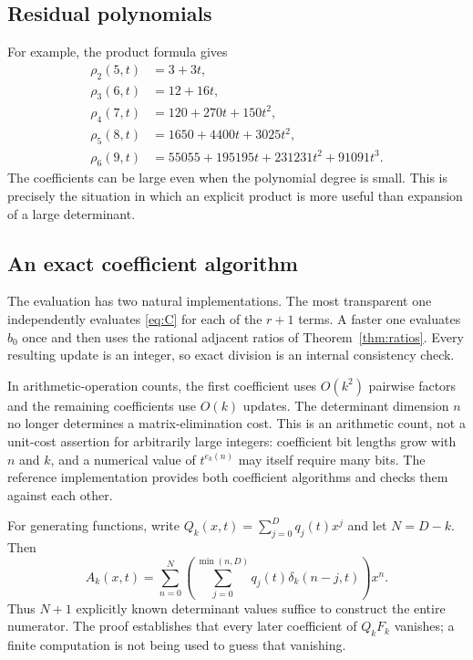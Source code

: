 \documentclass[11pt,letterpaper]{article}
\numberwithin{equation}{section}
\theoremstyle{definition}
\begin{document}
\subsection{Residual polynomials}
For example, the product formula gives
\begin{align*}
 \rho_2(5,t)&=3+3t,\\
 \rho_3(6,t)&=12+16t,\\
 \rho_4(7,t)&=120+270t+150t^2,\\
 \rho_5(8,t)&=1650+4400t+3025t^2,\\
 \rho_6(9,t)&=55055+195195t+231231t^2+91091t^3.
\end{align*}
The coefficients can be large even when the polynomial degree is small.
This is precisely the situation in which an explicit product is more
useful than expansion of a large determinant.

\subsection{An exact coefficient algorithm}
The evaluation has two natural implementations. The most transparent
one independently evaluates \eqref{eq:C} for each of the \(r+1\)
terms. A faster one evaluates \(b_0\) once and then uses the rational
adjacent ratios of Theorem~\ref{thm:ratios}. Every resulting update is
an integer, so exact division is an internal consistency check.

In arithmetic-operation counts, the first coefficient uses \(O(k^2)\)
pairwise factors and the remaining coefficients use \(O(k)\) updates.
The determinant dimension \(n\) no longer determines a matrix-elimination
cost. This is an arithmetic count, not a unit-cost assertion for
arbitrarily large integers: coefficient bit lengths grow with \(n\)
and \(k\), and a numerical value of \(t^{e_k(n)}\) may itself require
many bits. The reference implementation provides both coefficient
algorithms and checks them against each other.

For generating functions, write \(Q_k(x,t)=\sum_{j=0}^{D}q_j(t)x^j\)
and let \(N=D-k\). Then
\begin{equation}\label{eq:Analgorithm}
 A_k(x,t)=\sum_{n=0}^{N}
 \left(\sum_{j=0}^{\min(n,D)}q_j(t)\delta_k(n-j,t)\right)x^n.
\end{equation}
Thus \(N+1\) explicitly known determinant values suffice to construct
the entire numerator. The proof establishes that every later coefficient
of \(Q_kF_k\) vanishes; a finite computation is not being used to guess
that vanishing.
\end{document}
